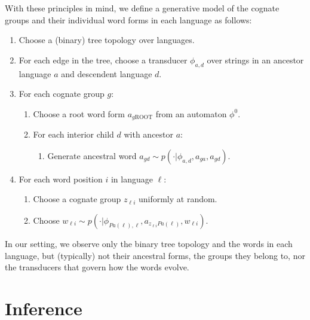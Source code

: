 \documentclass[11pt,a4paper]{article}
\begin{document}
With these principles in mind, we define a generative model of the cognate groups and their individual word forms in each language as follows:
\begin{enumerate}
  \item Choose a (binary) tree topology over languages.
  \item For each edge in the tree, choose a transducer $\phi_{a,d}$ over strings in an ancestor language $a$ and descendent language $d$.
  \item For each cognate group $g$:
    \begin{enumerate}
      \item Choose a root word form $a_{g\mathrm{ROOT}}$ from an automaton $\phi^0$.
      \item For each interior child $d$ with ancestor $a$:
        \begin{enumerate}
          \item Generate ancestral word $a_{gd} \sim p(\cdot|\phi_{a,d},a_{ga},a_{gd})$.
        \end{enumerate}
    \end{enumerate}
  \item For each word position $i$ in language $\ell$:
    \begin{enumerate}
      \item Choose a cognate group $z_{\ell i}$ uniformly at random. 
      \item Choose $w_{\ell i} \sim p(\cdot|\phi_{Pa(\ell),\ell},a_{z_{\ell i}Pa(\ell)},w_{\ell i})$.
    \end{enumerate}
\end{enumerate}

In our setting, we observe only the binary tree topology and the
words in each language, but (typically) not their ancestral forms,
the groups they belong to, nor the transducers that govern how the
words evolve. 

\section{Inference}
\end{document}
